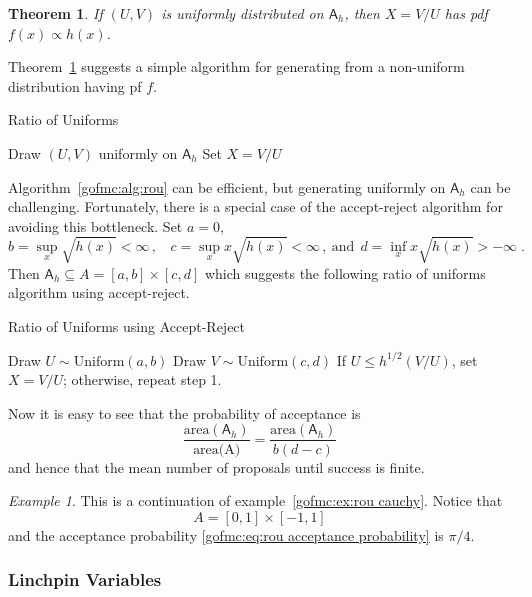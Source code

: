 \documentclass[12pt]{article}
\theoremstyle{plain}
\newtheorem{thm}{Theorem}[section]
\theoremstyle{definition}
\theoremstyle{remark}
\newtheorem{example}{Example}[section]
\newcommand{\sA}{\mathsf{A}}
\begin{document}
\begin{thm}
\label{gofmc:thm:rou}
If $(U,V)$ is uniformly distributed on $\sA_h$, then $X=V/U$ has pdf
$f(x) \propto h(x)$.
\end{thm}
Theorem~\ref{gofmc:thm:rou} suggests a simple algorithm for
generating from a non-uniform distribution having pf $f$.

\begin{algorithm}[H]
 \caption{Ratio of Uniforms} \label{gofmc:alg:rou}
 \begin{algorithmic}[1]
 \State Draw $(U,V)$ uniformly on $\sA_h$
 \State Set $X=V/U$   
 \end{algorithmic}
\end{algorithm}

Algorithm~\ref{gofmc:alg:rou} can be efficient, but generating
uniformly on $\sA_h$ can be challenging.  Fortunately, there is a
special case of the accept-reject algorithm for avoiding this
bottleneck.  Set $a=0$,
$$
b = \sup_{x} \sqrt{h(x)} < \infty\, , ~~~~ c = \sup_{x} x \sqrt{h(x)}
< \infty\, , ~ \text{and} ~~  d = \inf_{x} x \sqrt{h(x)} > -\infty \;
. 
$$
Then $\sA_h \subseteq A=[a,b] \times [c,d]$ which suggests the
following ratio of uniforms algorithm using accept-reject.

\begin{algorithm}[H]
 \caption{Ratio of Uniforms using Accept-Reject} \label{gofmc:alg:rou-ar}
 \begin{algorithmic}[1]
   \State Draw $U\sim \text{Uniform}(a,b)$
   \State Draw $V \sim \text{Uniform}(c,d)$
 \State If $U \le h^{1/2}(V/U)$, set $X=V/U$; otherwise, repeat step 1.
 \end{algorithmic}
\end{algorithm}

Now it is easy to see that the probability of acceptance is
\begin{equation}
\label{gofmc:eq:rou acceptance probability}
\frac{\text{area}(\sA_h)}{\text{area(A)}}=\frac{\text{area}(\sA_h)}{b(d-c)} 
\end{equation}
and hence that the mean number of proposals until success is finite.

\begin{example}
This is a continuation of example~\ref{gofmc:ex:rou cauchy}.  Notice that
$$
A=[0,1] \times [-1,1] 
$$
and the acceptance probability \eqref{gofmc:eq:rou acceptance
  probability} is $\pi / 4$.
\end{example}

\subsubsection{Linchpin Variables}
\label{gofmc:sec:linchpin variables}
\end{document}
